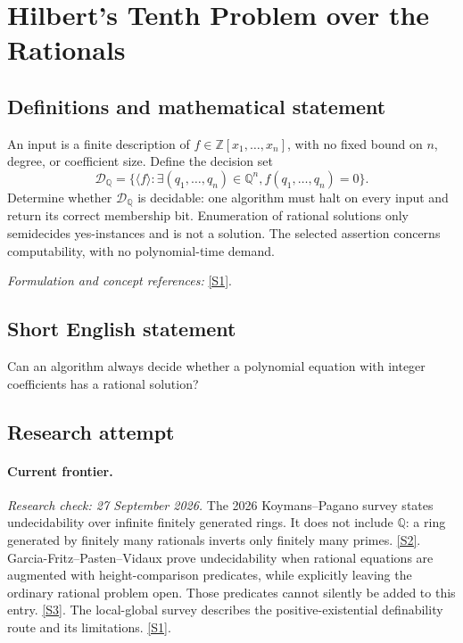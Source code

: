 \documentclass[11pt,a4paper]{article}
\newcommand{\Z}{\mathbb{Z}}
\newcommand{\Q}{\mathbb{Q}}
\newcommand{\sref}[2]{\hyperlink{source:#1:#2}{[S#2]}}
\newif\ifshowcatalogue
\newcommand{\cataloguescope}[1]{\ifshowcatalogue
 \paragraph{Exact scope in the supplied catalogue.}
 \begin{quote}\small #1\end{quote}\fi}
\begin{document}
\setcounter{section}{0}
\clearpage
\section*{\texorpdfstring{Hilbert's Tenth Problem over the Rationals}{Hilbert's Tenth Problem over the Rationals}}\label{statement}
\subsection{Definitions and mathematical statement}
An input is a finite description of $f\in\Z[x_1,\ldots,x_n]$, with no fixed bound on $n$, degree, or coefficient size. Define the decision set
\[
 \mathcal D_{\Q}=\{\langle f\rangle:\exists(q_1,\ldots,q_n)\in\Q^n,
                                  f(q_1,\ldots,q_n)=0\}.
\]
Determine whether $\mathcal D_{\Q}$ is decidable: one algorithm must halt on every input and return its correct membership bit. Enumeration of rational solutions only semidecides yes-instances and is not a solution. The selected assertion concerns computability, with no polynomial-time demand.
\par\smallskip\textit{Formulation and concept references:} \sref{statement}{1}.
\cataloguescope{There exists a total algorithm which, given any finite encoding of a multivariate polynomial f in Z[x\_1,...,x\_n] with arbitrary finite n and integer coefficients, halts and correctly decides whether there is q in Q\textasciicircum{}n with f(q)=0. Standard computably interconvertible polynomial encodings are equivalent; no uniform running-time complexity bound is part of the assertion.}
\subsection{Short English statement}
Can an algorithm always decide whether a polynomial equation with integer coefficients has a rational solution?
\subsection{Research attempt}
\paragraph{Current frontier.}
\textit{Research check: 27 September 2026.}
The 2026 Koymans--Pagano survey states undecidability over infinite
finitely generated rings. It does not include $\Q$: a ring generated by
finitely many rationals inverts only finitely many primes. \sref{statement}{2}.
Garcia-Fritz--Pasten--Vidaux prove undecidability when rational equations
are augmented with height-comparison predicates, while explicitly leaving
the ordinary rational problem open. Those predicates cannot silently be
added to this entry. \sref{statement}{3}.
The local-global survey describes the positive-existential definability
route and its limitations. \sref{statement}{1}.
\end{document}
